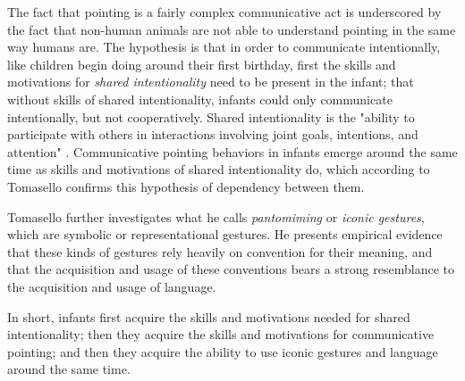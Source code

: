 The fact that pointing is a fairly complex communicative act is underscored by the fact that non-human animals are not able to understand pointing in the same way humans are. 
The hypothesis is that in order to communicate intentionally,
like children begin doing around their first birthday, first the skills and motivations for \emph{shared intentionality} need to be present in the infant; that without skills of shared intentionality, infants could only communicate intentionally, but not cooperatively.
Shared intentionality is the "ability to participate with others in interactions involving joint goals, intentions, and attention" \citep[p.~139]{Tomasello08-origins}. Communicative pointing behaviors in infants emerge around the same time as skills and motivations of shared intentionality do, which according to Tomasello confirms this hypothesis of dependency between them.

Tomasello further investigates what he calls \emph{pantomiming} or \emph{iconic gestures}, which are symbolic or representational gestures. 
He presents empirical evidence that these kinds of gestures rely heavily on convention for their meaning, and that the acquisition and usage of these conventions bears a strong resemblance to the acquisition and usage of language.

In short, infants first acquire the skills and motivations needed for shared intentionality; then they acquire the skills and motivations for communicative pointing; and then they acquire the ability to use iconic gestures and language around the same time.

